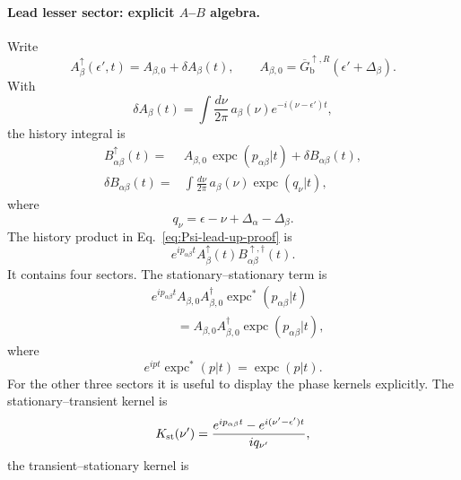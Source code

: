 \documentclass[
 reprint,
 superscriptaddress,
 amsmath,amssymb,
 aps,prb,
 longbibliography,
 floatfix
]{revtex4-2}
\newcommand{\expc}{\operatorname{expc}}
\begin{document}
\paragraph{Lead lesser sector: explicit $A$--$B$ algebra.}
Write
\begin{equation*}
A_\beta^\uparrow(\epsilon',t)
=
A_{\beta,0}+\delta A_\beta(t),
\qquad
A_{\beta,0}
=
\overline G_{\mathrm b}^{\uparrow,R}
(\epsilon'+\Delta_\beta).
\end{equation*}
With
\begin{equation*}
\delta A_\beta(t)
=
\int\frac{d\nu}{2\pi}\,
a_\beta(\nu)e^{-i(\nu-\epsilon')t},
\end{equation*}
the history integral is
\begin{equation}
\begin{aligned}
B_{\alpha\beta}^\uparrow(t)
={}&
A_{\beta,0}\,
\expc(p_{\alpha\beta}|t)
+
\delta B_{\alpha\beta}(t),
\\
\delta B_{\alpha\beta}(t)
={}&
\int\frac{d\nu}{2\pi}\,
a_\beta(\nu)
\expc(q_\nu|t),
\end{aligned}
\label{eq:up-asymp-B-decomp}
\end{equation}
where
\begin{equation*}
q_\nu
=
\epsilon-\nu
+\Delta_\alpha-\Delta_\beta.
\end{equation*}
The history product in Eq.~\eqref{eq:Psi-lead-up-proof} is
\begin{equation*}
e^{ip_{\alpha\beta}t}
A_\beta^\uparrow(t)
B_{\alpha\beta}^{\uparrow,\dagger}(t).
\end{equation*}
It contains four sectors. The stationary--stationary term is
\begin{equation}
\begin{aligned}
& e^{ip_{\alpha\beta}t}
A_{\beta,0}A_{\beta,0}^\dagger
\expc^*(p_{\alpha\beta}|t)
\\
&\qquad=
A_{\beta,0}A_{\beta,0}^\dagger
\expc(p_{\alpha\beta}|t),
\end{aligned}
\label{eq:up-asymp-AB-ss}
\end{equation}
where
\begin{equation*}
e^{ipt}\expc^*(p|t)=\expc(p|t).
\end{equation*}
For the other three sectors it is useful to display the phase kernels explicitly. The stationary--transient kernel is
\begin{equation*}
K_{\rm st}(\nu')
=
\frac{
 e^{ip_{\alpha\beta}t}
 -e^{i(\nu'-\epsilon')t}}
{i q_{\nu'}},
\end{equation*}
the transient--stationary kernel is
\end{document}
